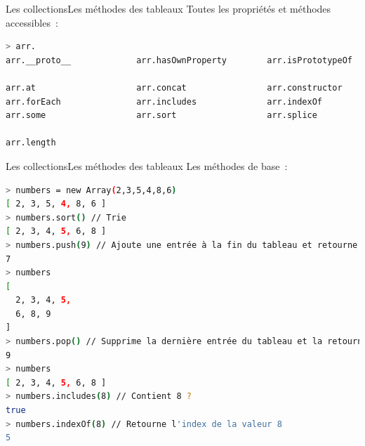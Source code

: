 \documentclass{beamer}
\begin{document}
    \begin{frame}[fragile]{Les collections}{Les méthodes des tableaux}
        Toutes les propriétés et méthodes accessibles~:
        \begin{lstlisting}[language=Bash,title={\scriptsize{Node.js}},basicstyle=\tiny\ttfamily]
> arr.
arr.__proto__             arr.hasOwnProperty        arr.isPrototypeOf         arr.propertyIsEnumerable  arr.valueOf

arr.at                    arr.concat                arr.constructor           arr.copyWithin            arr.entries               arr.every                 arr.fill                  arr.filter                arr.find                  arr.findIndex             arr.findLast              arr.findLastIndex         arr.flat                  arr.flatMap
arr.forEach               arr.includes              arr.indexOf               arr.join                  arr.keys                  arr.lastIndexOf           arr.map                   arr.pop                   arr.push                  arr.reduce                arr.reduceRight           arr.reverse               arr.shift                 arr.slice
arr.some                  arr.sort                  arr.splice                arr.toLocaleString        arr.toReversed            arr.toSorted              arr.toSpliced             arr.toString              arr.unshift               arr.values                arr.with

arr.length
        \end{lstlisting}
    \end{frame}

    \begin{frame}[fragile]{Les collections}{Les méthodes des tableaux}
        Les méthodes de base~:
        \begin{lstlisting}[language=Bash,title={\scriptsize{Node.js}}]
> numbers = new Array(2,3,5,4,8,6)
[ 2, 3, 5, 4, 8, 6 ]
> numbers.sort() // Trie
[ 2, 3, 4, 5, 6, 8 ]
> numbers.push(9) // Ajoute une entrée à la fin du tableau et retourne la taille
7
> numbers
[
  2, 3, 4, 5,
  6, 8, 9
]
> numbers.pop() // Supprime la dernière entrée du tableau et la retourne
9
> numbers
[ 2, 3, 4, 5, 6, 8 ]
> numbers.includes(8) // Contient 8 ?
true
> numbers.indexOf(8) // Retourne l'index de la valeur 8
5
        \end{lstlisting}
    \end{frame}
\end{document}
